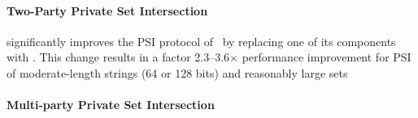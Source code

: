 \paragraph{Two-Party Private Set Intersection}



\cite{CCS:KKRT16} significantly improves the PSI protocol of~\cite{DBLP:conf/uss/Pinkas0SZ15} by replacing one of its components with \batchOPRF. This change results in a factor 2.3--3.6$\times$ performance improvement for PSI of moderate-length strings (64 or 128 bits) and reasonably large sets  

\paragraph{Multi-party Private Set Intersection}
